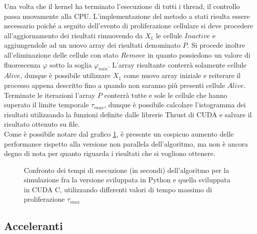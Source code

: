 Una volta che il kernel ha terminato l'esecuzione di tutti i thread, il
controllo passa nuovamente alla CPU.
L'implementazione del metodo a stati risulta essere necessario poiché a seguito
dell'evento di proliferazione cellulare
si deve procedere all'aggiornamento dei risultati rimuovendo
da $X_{1}$ le cellule $Inactive$ e aggiungendole ad un nuovo array dei
risultati denominato $P$.
Si procede inoltre all'eliminazione delle cellule con stato $Remove$ in quanto
possiedono un valore di fluorescenza $\varphi$ sotto la soglia $\varphi_{min}$.
L'array risultante conterrà solamente cellule $Alive$, dunque è possibile
utilizzare $X_{1}$ come nuovo array iniziale e reiterare
il processo appena descritto fino a quando non saranno più presenti cellule
$Alive$.
Terminate le iterazioni l'array $P$ conterrà tutte e sole le cellule che hanno
superato il limite temporale $\tau_{max}$, dunque è possibile calcolare
l'istogramma dei risultati utilizzando la funzioni definite dalle librerie
Thrust\cite{bell2011thrust} di CUDA e salvare il risultato ottenuto
su file.
\\
Come è possibile notare dal grafico \ref{chart:python-cuda}, è presente un
cospicuo aumento delle performance
rispetto alla versione non parallela dell'algoritmo, ma non è ancora degno
di nota per quanto riguarda i risultati che si vogliono ottenere.
\begin{figure}[t]
    \centering
    \caption{Confronto dei tempi di esecuzione (in secondi) dell'algoritmo per
        la simulazione fra la versione sviluppata in Python e quella sviluppata
        in CUDA C, utilizzando differenti valori di tempo massimo di
        proliferazione $\tau_{max}$}
    \label{chart:python-cuda}
\end{figure}

\subsection{Acceleranti}

